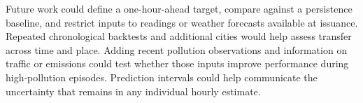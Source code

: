 \documentclass[11pt]{article}
\begin{document}
Future work could define a one-hour-ahead target, compare against a persistence baseline, and restrict inputs to readings or weather forecasts available at issuance. Repeated chronological backtests and additional cities would help assess transfer across time and place. Adding recent pollution observations and information on traffic or emissions could test whether those inputs improve performance during high-pollution episodes. Prediction intervals could help communicate the uncertainty that remains in any individual hourly estimate.



\end{document}
